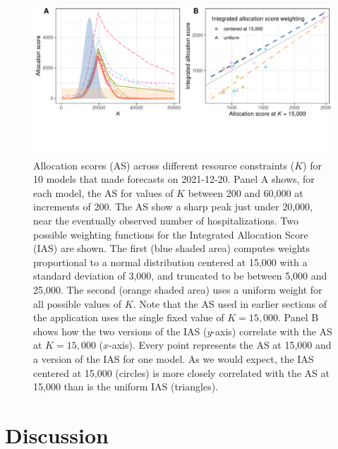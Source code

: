 \documentclass{article}\usepackage[]{graphicx}\usepackage[]{xcolor}
\makeatletter
\def\maxwidth{ %
  \ifdim\Gin@nat@width>\linewidth
    \linewidth
  \else
    \Gin@nat@width
  \fi
}
\newenvironment{knitrout}{}{} %
\makeatother
\begin{document}
\begin{knitrout}
\color{fgcolor}\begin{figure}[H]
\includegraphics[width=\maxwidth]{figure/multi-k-1} \caption[Allocation scores (AS) across different resource constraints ($K$) for 10 models that made forecasts on 2021-12-20]{Allocation scores (AS) across different resource constraints ($K$) for 10 models that made forecasts on 2021-12-20. Panel A shows, for each model, the AS for values of $K$ between 200 and 60,000 at increments of 200. The AS show a sharp peak just under 20,000, near the eventually observed number of hospitalizations. Two possible weighting functions for the Integrated Allocation Score (IAS) are shown. The first (blue shaded area) computes weights proportional to a normal distribution centered at 15,000 with a standard deviation of 3,000, and truncated to be between 5,000 and 25,000. The second (orange shaded area) uses a uniform weight for all possible values of $K$. Note that the AS used in earlier sections of the application uses the single fixed value of $K=15,000$.  Panel B shows how the two versions of the IAS ($y$-axis) correlate with the AS at $K=15,000$ ($x$-axis). Every point represents the AS at 15,000 and a version of the IAS for one model. As we would expect, the IAS centered at 15,000 (circles) is more closely correlated with the AS at 15,000 than is the uniform IAS (triangles).}\label{fig:multi-k}
\end{figure}

\end{knitrout}

\section{Discussion}
\label{sec:discussion}
\end{document}
